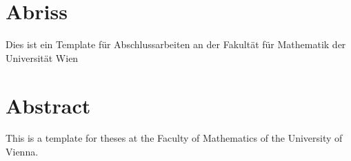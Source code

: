 \section*{Abriss}
Dies ist ein Template für Abschlussarbeiten an der Fakultät für Mathematik der Universität Wien
\vspace{1.5cm}
\section*{Abstract}
This is a template for theses at the Faculty of Mathematics of the University of Vienna.
